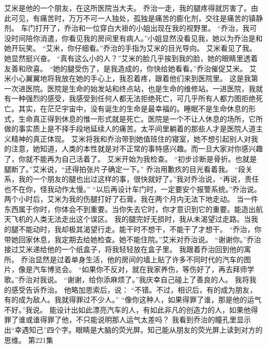 \documentclass[a4paper,12pt,UTF8,twoside]{ctexbook}
\begin{document}
        艾米是他的一个朋友，在这所医院当大夫。 
        乔治一走，我的腿疼得就厉害了。由此可见，有痛苦时，万万不可一人独处，孤独是痛苦的膨化剂，交往是痛苦的镇静剂。 
        车门打开了，乔治和一位穿白大褂的小姐出现在我的视野里。 
        “乔治，我可没时间陪你消遣，你看见我的房间里有病人。”小姐显然没看见我，她以为乔治是和她开玩笑。 
        “艾米，你仔细看。”乔治的手指为艾米的目光导向。 
        艾米看见了我。她显然挺兴奋。 
        “真有这么小的人？”艾米的脸几乎挨到我的脸，她的眼睛里透着友善和欣喜。 
        “她的腿受伤了，是我造成的，你快给她看看。”乔治催促艾米。 
        艾米小心翼翼地将我放在她的手心上，我忍着疼，跟着他们来到医院里。 
        这是我第一次进医院。医院是生命的始发站和终点站，也是生命的维修站。一进医院，我就有一种强烈的感受，我感受到任何人都无法拒绝死亡，可几乎所有人都力图拒绝死亡。其实，在茫茫宇宙中，没有诞生的生命是最幸福的。睡眠不是生命休息的形式，生命真正得到休息的惟一形式就是死亡。医院是一个不让人休息的场所，它所做的事实质上是不择手段地延续人的痛苦。太平间里躺着的那些人才是医院人道主义精神的真正体现。 
        艾米将我和乔治带到她值班住的寝室，她不想引起别人对我的注意，她知道，人类的本性就是对不正常的事特感兴趣。而一旦大家对你感兴趣了，你就不能再为自己活着了。 
        艾米开始为我检查。 
        “初步诊断是骨折。也就是腿断了。”艾米说，“还得拍张片子确定一下。” 
        乔治用歉疚的目光看着我。 
        “段关系，我的一个朋友的腿也出过这样的事，很快就好了。”我对乔治说，“再说，责任也不在你，怪我动作太慢。” 
        “以后再设计车门时，一定要安个报警系统。”乔治说。 
        两个小时后，艾米为我的伤腿打好了石膏。我在两个月内无法下地走动。 
        当一件东西属于你时，你体会不到重要。当你失去它时，你才意识到它的重要。能造出航天飞机的人类无法走出这个误区。 
        我的腿完好无损时，我从未渴望过走路。当我的腿不能动时，我却极其渴望行走。能干时不想干，不能干了才想干。 
        “乔治，你带她回家休息，我定期去给她检查。她不能住院。”艾米对乔治说。 
        “谢谢你。”乔治接过艾米递给他的一个纸盒子，将我轻轻放在盒子里。 
        我跟着乔治回到他的寓所。 
        乔治显然是过着单身生活，他的房间的墙上贴了许多不同时代的汽车的图片，像是汽车博览会。 
        “如果你不反对，就在我家养伤，等伤好了，再去拜师学歌。”乔治对我说。 
        “谢谢，给你添麻烦了。”我庆幸自己碰上了善良的人。 
        我将我的感受告诉乔治。 
        他略加思索后，说： 
        “不错。不过，相识后，有的成为朋友，有的成为敌人。我就得罪过不少人。” 
        “像你这种人，如果得罪了谁，那是他的运气不好。”我说。 
        能设计出如此漂亮汽车的人，有如此非凡的创造力的人，如果他得罪了谁或谁得罪了他，不只能说明那人运气太差吗？ 
        我看到乔治的瞳孔里显示出“幸遇知己”四个字。眼睛是大脑的荧光屏。知己能从朋友的荧光屏上读到对方的思维。   第221集 
\end{document}

